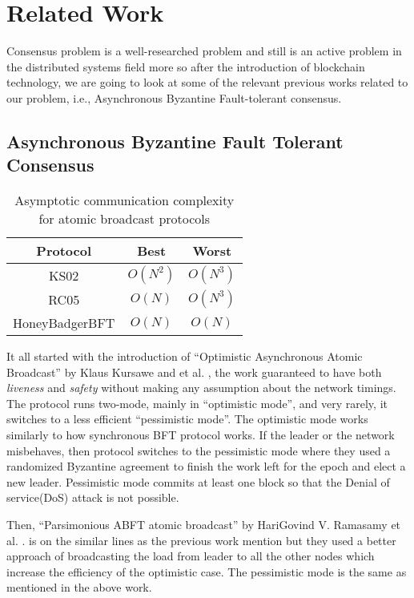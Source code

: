 \chapter{Related Work}
\label{ch:related_Work}


Consensus problem is a well-researched problem and still is an active problem in the distributed systems field more so after the introduction of blockchain technology, we are going to look at some of the relevant previous works related to our problem, i.e., Asynchronous Byzantine Fault-tolerant consensus.

\section{Asynchronous Byzantine Fault Tolerant Consensus}
\begin{table}[!h]
    \centering
    \begin{tabular}{|c|c|c|}
    \hline
        \textbf{Protocol} &\textbf{Best} & \textbf{Worst}\\\hline    
         KS02 \cite{kursawe2005optimistic}&  $O(N^{2})$&$O(N^{3})$\\
         RC05 \cite{ramasamy2005parsimonious}&  $O(N)$&$O(N^{3})$\\
         HoneyBadgerBFT \cite{miller2016honey}&  $O(N)$ & $O(N)$\\
          \hline
    \end{tabular}
    \caption{Asymptotic communication complexity for atomic broadcast protocols\cite{miller2016honey}}
    \label{tab:complexity}
\end{table}
It all started with the introduction of ``Optimistic Asynchronous Atomic Broadcast'' by Klaus Kursawe and et al. \cite{kursawe2005optimistic}, the work guaranteed to have both \textit{liveness} and \textit{safety} without making any assumption about the network timings.  The protocol runs two-mode, mainly in ``optimistic mode'', and very rarely, it switches to a less efficient ``pessimistic mode''. The optimistic mode works similarly to how synchronous BFT protocol works. If the leader or the network misbehaves, then protocol switches to the pessimistic mode where they used a randomized Byzantine agreement to finish the work left for the epoch and elect a new leader. Pessimistic mode commits at least one block so that the Denial of service(DoS) attack is not possible.

Then, ``Parsimonious ABFT atomic broadcast'' by HariGovind V. Ramasamy et al. .\cite{ramasamy2005parsimonious} is on the similar lines as the previous work mention but they used a better approach of broadcasting the load from leader to all the other nodes which increase the efficiency of the optimistic case. The pessimistic mode is the same as mentioned in the above work.


